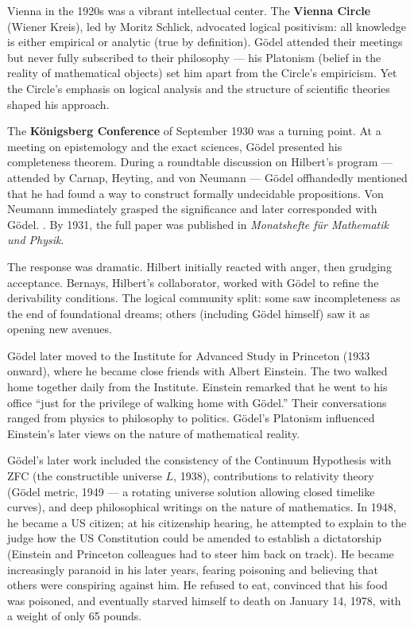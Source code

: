 Vienna in the 1920s was a vibrant intellectual center. The \textbf{Vienna Circle} (Wiener Kreis), led by Moritz Schlick, advocated logical positivism: all knowledge is either empirical or analytic (true by definition). Gödel attended their meetings but never fully subscribed to their philosophy --- his Platonism (belief in the reality of mathematical objects) set him apart from the Circle's empiricism. Yet the Circle's emphasis on logical analysis and the structure of scientific theories shaped his approach.

The \textbf{Königsberg Conference} of September 1930 was a turning point. At a meeting on epistemology and the exact sciences, Gödel presented his completeness theorem. During a roundtable discussion on Hilbert's program --- attended by Carnap, Heyting, and von Neumann --- Gödel offhandedly mentioned that he had found a way to construct formally undecidable propositions. Von Neumann immediately grasped the significance and later corresponded with Gödel. \cite{godel1931}. By 1931, the full paper was published in \emph{Monatshefte für Mathematik und Physik}.

The response was dramatic. Hilbert initially reacted with anger, then grudging acceptance. Bernays, Hilbert's collaborator, worked with Gödel to refine the derivability conditions. The logical community split: some saw incompleteness as the end of foundational dreams; others (including Gödel himself) saw it as opening new avenues.

Gödel later moved to the Institute for Advanced Study in Princeton (1933 onward), where he became close friends with Albert Einstein. The two walked home together daily from the Institute. Einstein remarked that he went to his office ``just for the privilege of walking home with Gödel.'' Their conversations ranged from physics to philosophy to politics. Gödel's Platonism influenced Einstein's later views on the nature of mathematical reality.

Gödel's later work included the consistency of the Continuum Hypothesis with ZFC (the constructible universe $L$, 1938), contributions to relativity theory (Gödel metric, 1949 --- a rotating universe solution allowing closed timelike curves), and deep philosophical writings on the nature of mathematics. In 1948, he became a US citizen; at his citizenship hearing, he attempted to explain to the judge how the US Constitution could be amended to establish a dictatorship (Einstein and Princeton colleagues had to steer him back on track). He became increasingly paranoid in his later years, fearing poisoning and believing that others were conspiring against him. He refused to eat, convinced that his food was poisoned, and eventually starved himself to death on January 14, 1978, with a weight of only 65 pounds.

